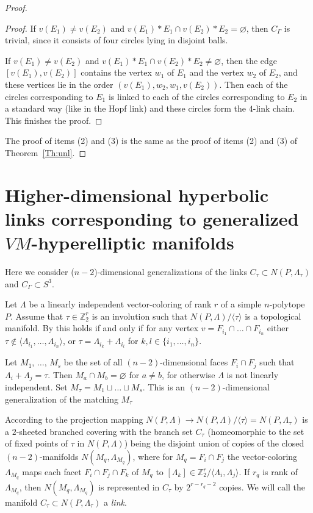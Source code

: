 \documentclass[12pt]{amsart}
\theoremstyle{definition}
\theoremstyle{remark}
\begin{document}
\begin{proof}
\begin{proof}
If $v(E_1)\ne v(E_2)$ and  $v(E_1)*E_1\cap v(E_2)*E_2=\varnothing$, then $C_\Gamma$ is trivial, since it 
consists of four circles lying in disjoint balls.

If $v(E_1)\ne v(E_2)$ and  $v(E_1)*E_1\cap v(E_2)*E_2\ne\varnothing$, then the edge $[v(E_1),v(E_2)]$
contains the vertex $w_1$ of $E_1$ and the vertex $w_2$ of $E_2$, and these vertices lie in the order $(v(E_1), w_2, w_1, v(E_2))$.
Then each of the circles corresponding to $E_1$ is linked to each of the circles corresponding to $E_2$
in a standard way (like in the Hopf link) and these circles form the $4$-link chain. This finishes the proof.
\end{proof}
The proof of items (2) and (3) is the same as the proof of items (2) and (3) of Theorem~\ref{Th:unl}. 
\end{proof}

\section{Higher-dimensional hyperbolic links corresponding to generalized $VM$-hyperelliptic manifolds}
Here we consider ($n-2$)-dimensional generalizations of the links 
$C_\tau\subset N(P,\Lambda_\tau)$ and $C_\Gamma\subset S^3$. 

Let $\Lambda$ be a linearly independent vector-coloring of rank $r$ of a simple $n$-polytope $P$. Assume that
$\tau\in \mathbb Z_2^r$ is an involution such that $N(P,\Lambda)/\langle\tau\rangle$ is a topological manifold.
By \cite[Proposition 4.15]{E26} this holds if and only if for any vertex $v=F_{i_1}\cap\dots\cap F_{i_n}$
either $\tau\notin\langle \Lambda_{i_1},\dots,\Lambda_{i_n}\rangle$, or $\tau=\Lambda_{i_k}+\Lambda_{i_l}$
for $k,l\in\{i_1,\dots, i_n\}$.

Let $M_1$, $\dots$, $M_s$ be the set of all $(n-2)$-dimensional faces  $F_i\cap F_j$ such that  
$\Lambda_i+\Lambda_j=\tau$. Then $M_a\cap M_b=\varnothing$ for $a\ne b$, for otherwise $\Lambda$ is not linearly
independent. Set $M_\tau=M_1\sqcup\dots\sqcup M_s$. This is an $(n-2)$-dimensional generalization of the matching $M_\tau$ 

According to \cite[Proposition 4.31]{E26} the projection mapping 
$N(P,\Lambda)\to N(P,\Lambda)/\langle\tau\rangle=N(P,\Lambda_\tau)$ 
is a $2$-sheeted branched covering with the branch set $C_\tau$ 
(homeomorphic to the set of fixed points of $\tau$ in $N(P,\Lambda)$) being the disjoint union of copies of the closed 
$(n-2)$-manifolds $N(M_q,\Lambda_{M_q})$, where for $M_q=F_i\cap F_j$ the vector-coloring $\Lambda_{M_q}$
maps each facet $F_i\cap F_j\cap F_k$ of $M_q$ to $[\Lambda_k]\in\mathbb Z_2^r/\langle\Lambda_i,\Lambda_j\rangle$.
If $r_q$ is rank of $\Lambda_{M_q}$, then $N(M_q,\Lambda_{M_q})$ is represented in $C_\tau$ by  $2^{r-r_q-2}$ copies.
We will call the manifold $C_\tau\subset N(P,\Lambda_\tau)$ a {\it link}.
\end{document}
